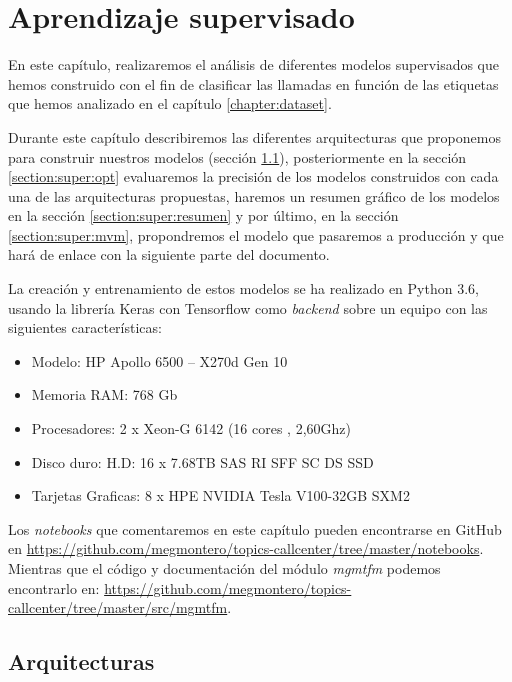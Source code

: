 \chapter{Aprendizaje supervisado}
\label{chapter:super}
En este capítulo, realizaremos el análisis de diferentes modelos supervisados que hemos construido con el fin de clasificar las llamadas en función de las etiquetas que hemos analizado en el capítulo \ref{chapter:dataset}.

Durante este capítulo describiremos las diferentes arquitecturas que proponemos para construir nuestros modelos (sección  \ref{section:super:arq}), posteriormente en la sección \ref{section:super:opt} evaluaremos la precisión de los modelos construidos con cada una de las arquitecturas propuestas, haremos un resumen gráfico de los modelos en la sección \ref{section:super:resumen} y por último, en la sección \ref{section:super:mvm}, propondremos el modelo que pasaremos a producción y que hará de enlace con la siguiente parte del documento. 

La creación y entrenamiento de estos modelos se ha realizado en Python 3.6, usando la librería Keras con Tensorflow como \textit{backend} sobre un equipo con las siguientes características:

\begin{itemize}
\item Modelo: HP Apollo 6500 – X270d Gen 10

\item Memoria RAM: 768 Gb

\item Procesadores: 2 x Xeon-G 6142 (16 cores , 2,60Ghz)

\item Disco duro: H.D: 16 x 7.68TB SAS RI SFF SC DS SSD

\item Tarjetas Graficas: 8 x HPE NVIDIA Tesla V100-32GB SXM2
\end{itemize}


Los \textit{notebooks} que comentaremos en este capítulo pueden encontrarse en GitHub en \href{https://github.com/megmontero/topics-callcenter/tree/master/notebooks}{https://github.com/megmontero/topics-callcenter/tree/master/notebooks}. Mientras que el código y documentación del módulo \textit{mgmtfm} podemos encontrarlo en: \href{https://github.com/megmontero/topics-callcenter/tree/master/src/mgmtfm}{https://github.com/megmontero/topics-callcenter/tree/master/src/mgmtfm}.


\section{Arquitecturas}
\label{section:super:arq}

